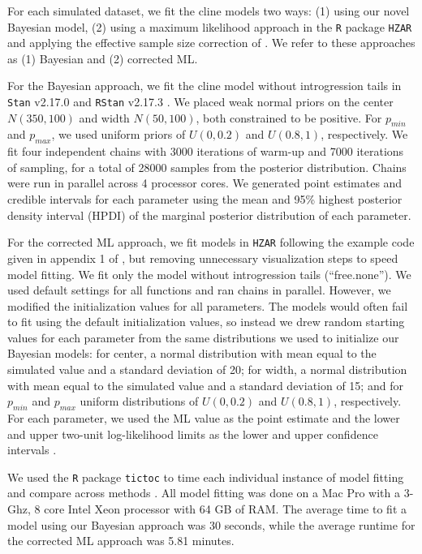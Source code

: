 \documentclass[]{article}
\begin{document}
For each simulated dataset, we fit the cline models two ways: (1) using
our novel Bayesian model, (2) using a maximum likelihood approach in the
\texttt{R} package \texttt{HZAR} \citep{Derryberry:2014jw} and applying
the effective sample size correction of \citet{Alexandrino:2005vl}. We
refer to these approaches as (1) Bayesian and (2) corrected ML.

For the Bayesian approach, we fit the cline model without introgression
tails in \texttt{Stan} v2.17.0 and \texttt{RStan} v2.17.3
\citep{Carpenter:2017ke, Anonymous:tt}. We placed weak normal priors on
the center \(N(350, 100)\) and width \(N(50, 100)\), both constrained to
be positive. For \(p_{min}\) and \(p_{max}\), we used uniform priors of
\(U(0,0.2)\) and \(U(0.8,1)\), respectively. We fit four independent
chains with 3000 iterations of warm-up and 7000 iterations of sampling,
for a total of 28000 samples from the posterior distribution. Chains
were run in parallel across 4 processor cores. We generated point
estimates and credible intervals for each parameter using the mean and
95\% highest posterior density interval (HPDI) of the marginal posterior
distribution of each parameter.

For the corrected ML approach, we fit models in \texttt{HZAR} following
the example code given in appendix 1 of \citealt{Derryberry:2014jw}, but
removing unnecessary visualization steps to speed model fitting. We fit
only the model without introgression tails (``free.none''). We used
default settings for all functions and ran chains in parallel. However,
we modified the initialization values for all parameters. The models
would often fail to fit using the default initialization values, so
instead we drew random starting values for each parameter from the same
distributions we used to initialize our Bayesian models: for center, a
normal distribution with mean equal to the simulated value and a
standard deviation of 20; for width, a normal distribution with mean
equal to the simulated value and a standard deviation of 15; and for
\(p_{min}\) and \(p_{max}\) uniform distributions of \(U(0,0.2)\) and
\(U(0.8,1)\), respectively. For each parameter, we used the ML value as
the point estimate and the lower and upper two-unit log-likelihood
limits as the lower and upper confidence intervals
\citep{Derryberry:2014jw}.

We used the \texttt{R} package \texttt{tictoc} to time each individual
instance of model fitting and compare across methods \citep{tictoc:tt}.
All model fitting was done on a Mac Pro with a 3-Ghz, 8 core Intel Xeon
processor with 64 GB of RAM. The average time to fit a model using our
Bayesian approach was 30 seconds, while the average runtime for the
corrected ML approach was 5.81 minutes.
\end{document}

